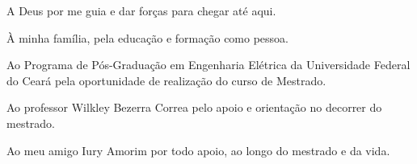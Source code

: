 A Deus por me guia e dar forças para chegar até aqui. 

À minha família, pela educação e formação como pessoa.

Ao Programa de Pós-Graduação em Engenharia Elétrica da Universidade Federal do Ceará pela oportunidade de realização do curso de Mestrado.

Ao professor Wilkley Bezerra Correa pelo apoio e orientação no decorrer do mestrado.

Ao meu amigo Iury Amorim por todo apoio, ao longo do mestrado e da vida.
